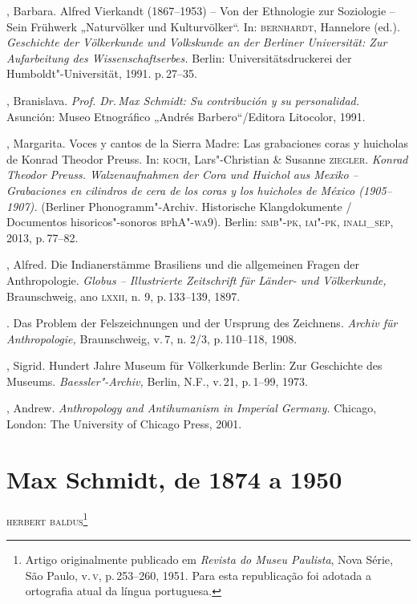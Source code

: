 \begin{bibliohedra}
 , Barbara. Alfred Vierkandt (1867--1953) -- Von der Ethnologie zur
 Soziologie -- Sein Frühwerk „Naturvölker und Kulturvölker``. In:
 \textsc{bernhardt}, Hannelore (ed.). \textit{Geschichte der Völkerkunde und
 Volkskunde an der Berliner Universität: Zur Aufarbeitung des
 Wissenschaftserbes.} Berlin: Universitätsdruckerei der
 Humboldt"-Universität, 1991. p.\,27--35.

 , Branislava. \textit{Prof. Dr.\,Max Schmidt: Su contribución y su
 personalidad.} Asunción: Museo Etnográfico „Andrés Barbero``/Editora
 Litocolor, 1991.

 , Margarita. Voces y cantos de la Sierra Madre: Las
 grabaciones coras y huicholas de Konrad Theodor Preuss. In: \textsc{koch},
 Lars"-Christian \& Susanne \textsc{ziegler}. \textit{Konrad Theodor Preuss.
 Walzenaufnahmen der Cora und Huichol aus Mexiko -- Grabaciones en
 cilindros de cera de los coras y los huicholes de México (1905--1907).}
 (Berliner Phonogramm"-Archiv. Historische Klangdokumente / Documentos
 hisoricos"-sonoros \textsc{bp}h\textsc{A}"-\textsc{wa}9). Berlin: \textsc{smb"-pk, iai"-pk, inali\_sep}, 2013,
 p.\,77--82.

 , Alfred. Die Indianerstämme Brasiliens und die allgemeinen
 Fragen der Anthropologie. \textit{Globus -- Illustrierte Zeitschrift für
 Länder- und Völkerkunde,} Braunschweig, ano \textsc{lxxii}, n. 9, p.\,133--139,
 1897.

 \titidem. Das Problem der Felszeichnungen und der Ursprung
 des Zeichnens. \textit{Archiv für Anthropologie,} Braunschweig, v.\,7,
 n. 2/3, p.\,110--118, 1908.

 , Sigrid. Hundert Jahre Museum für Völkerkunde Berlin:
 Zur Geschichte des Museums. \textit{Baessler"-Archiv,} Berlin, N.F., v.\,21, p.\,1--99, 1973.

 , Andrew. \textit{Anthropology and Antihumanism in Imperial
 Germany.} Chicago, London: The University of Chicago Press, 2001.
 \end{bibliohedra}

\chapter*{Max Schmidt, de 1874 a 1950}

\begin{flushright}
\textsc{herbert baldus}\footnote{Artigo originalmente publicado
  em \textit{Revista do Museu Paulista}, Nova Série, São Paulo, v.\,\textsc{v}, p.\,253--260, 1951. Para esta republicação foi adotada a ortografia atual
  da língua portuguesa.}
\end{flushright}

